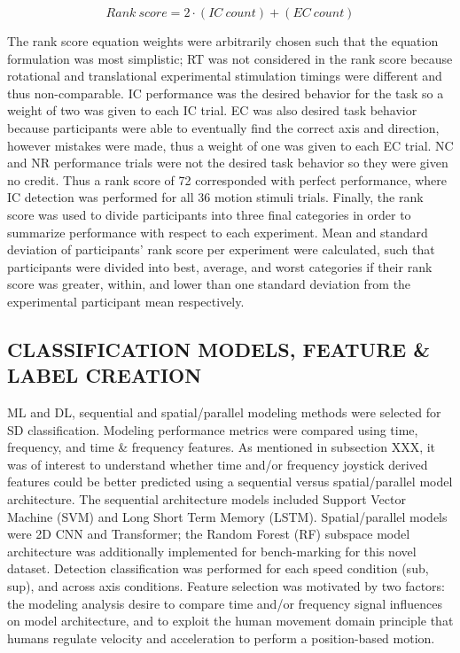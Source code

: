 \documentclass{ieeeaccess}
\begin{document}
\begin{equation}
Rank~score = 2 \cdot (IC~count) + (EC~count)
\label{eqn_rank_score}
\end{equation}

The rank score equation weights were arbitrarily chosen such that the equation formulation was most simplistic; RT was not considered in the rank score because rotational and translational experimental stimulation timings were different and thus non-comparable. IC performance was the desired behavior for the task so a weight of two was given to each IC trial. EC was also desired task behavior because participants were able to eventually find the correct axis and direction, however mistakes were made, thus a weight of one was given to each EC trial. NC and NR performance trials were not the desired task behavior so they were given no credit. Thus a rank score of 72 corresponded with perfect performance, where IC detection was performed for all 36 motion stimuli trials. Finally, the rank score was used to divide participants into three final categories in order to summarize performance with respect to each experiment. Mean and standard deviation of participants' rank score per experiment were calculated, such that participants were divided into best, average, and worst categories if their rank score was greater, within, and lower than one standard deviation from the experimental participant mean respectively.

\subsection{CLASSIFICATION MODELS, FEATURE \& LABEL CREATION}
ML and DL, sequential and spatial/parallel modeling methods were selected for SD classification. Modeling performance metrics were compared using time, frequency, and time \& frequency features. As mentioned in subsection XXX, it was of interest to understand whether time and/or frequency joystick derived features could be better predicted using a sequential versus spatial/parallel model architecture. The sequential architecture models included Support Vector Machine (SVM) and Long Short Term Memory (LSTM). Spatial/parallel models were 2D CNN and Transformer; the Random Forest (RF) subspace model architecture was additionally implemented for bench-marking for this novel dataset. Detection classification was performed for each speed condition (sub, sup), and across axis conditions. Feature selection was motivated by two factors: the modeling analysis desire to compare time and/or frequency signal influences on model architecture, and to exploit the human movement domain principle that humans regulate velocity and acceleration to perform a position-based motion.
\end{document}
